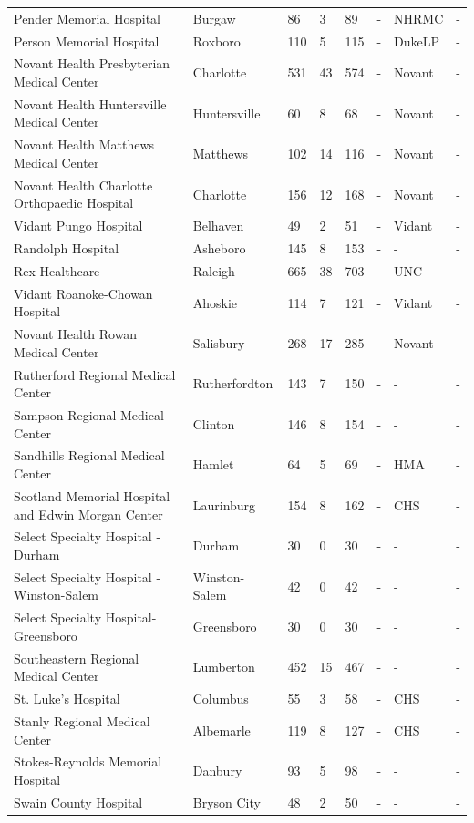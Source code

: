 \documentclass{article}
\begin{document}
\begin{tabular}{llllllll}
Pender Memorial Hospital & Burgaw & 86 & 3 & 89 & - & NHRMC & - \\
Person Memorial Hospital & Roxboro & 110 & 5 & 115 & - & DukeLP & - \\
Novant Health Presbyterian Medical Center & Charlotte & 531 & 43 & 574 & - & Novant & - \\
Novant Health Huntersville Medical Center & Huntersville & 60 & 8 & 68 & - & Novant & - \\
Novant Health Matthews Medical Center & Matthews & 102 & 14 & 116 & - & Novant & - \\
Novant Health Charlotte Orthopaedic Hospital & Charlotte & 156 & 12 & 168 & - & Novant & - \\
Vidant Pungo Hospital & Belhaven & 49 & 2 & 51 & - & Vidant & - \\
Randolph Hospital & Asheboro & 145 & 8 & 153 & - & - & - \\
Rex Healthcare & Raleigh & 665 & 38 & 703 & - & UNC & - \\
Vidant Roanoke-Chowan Hospital & Ahoskie & 114 & 7 & 121 & - & Vidant & - \\
Novant Health Rowan Medical Center & Salisbury & 268 & 17 & 285 & - & Novant & - \\
Rutherford Regional Medical Center & Rutherfordton & 143 & 7 & 150 & - & - & - \\
Sampson Regional Medical Center & Clinton & 146 & 8 & 154 & - & - & - \\
Sandhills Regional Medical Center & Hamlet & 64 & 5 & 69 & - & HMA & - \\
Scotland Memorial Hospital and Edwin Morgan Center & Laurinburg & 154 & 8 & 162 & - & CHS & - \\
Select Specialty Hospital - Durham & Durham & 30 & 0 & 30 & - & - & - \\
Select Specialty Hospital - Winston-Salem & Winston-Salem & 42 & 0 & 42 & - & - & - \\
Select Specialty Hospital-Greensboro & Greensboro & 30 & 0 & 30 & - & - & - \\
Southeastern Regional Medical Center & Lumberton & 452 & 15 & 467 & - & - & - \\
St. Luke's Hospital & Columbus & 55 & 3 & 58 & - & CHS & - \\
Stanly Regional Medical Center & Albemarle & 119 & 8 & 127 & - & CHS & - \\
Stokes-Reynolds Memorial Hospital & Danbury & 93 & 5 & 98 & - & - & - \\
Swain County Hospital & Bryson City & 48 & 2 & 50 & - & - & - \\

\end{tabular}
\end{document}
